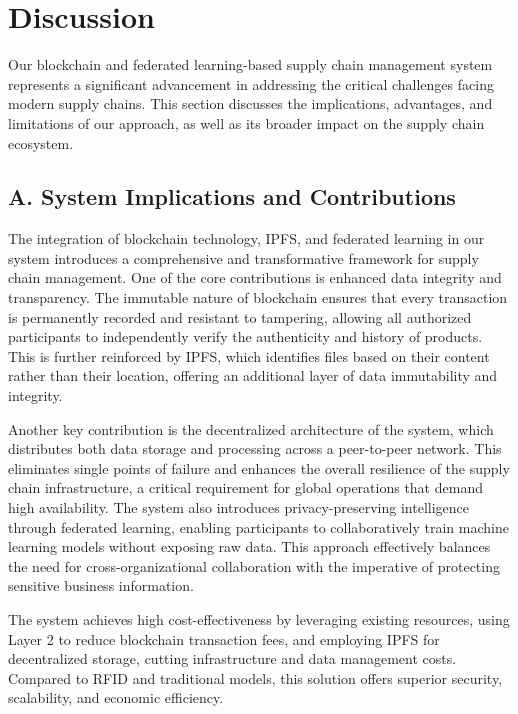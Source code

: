 \documentclass[conference]{IEEEtran}
\begin{document}
\section{Discussion}

Our blockchain and federated learning-based supply chain management system represents a significant advancement in addressing the critical challenges facing modern supply chains. This section discusses the implications, advantages, and limitations of our approach, as well as its broader impact on the supply chain ecosystem.

\subsection*{A. System Implications and Contributions}
    The integration of blockchain technology, IPFS, and federated learning in our system introduces a comprehensive and transformative framework for supply chain management. One of the core contributions is enhanced data integrity and transparency. The immutable nature of blockchain ensures that every transaction is permanently recorded and resistant to tampering, allowing all authorized participants to independently verify the authenticity and history of products. This is further reinforced by IPFS, which identifies files based on their content rather than their location, offering an additional layer of data immutability and integrity.
    
    Another key contribution is the decentralized architecture of the system, which distributes both data storage and processing across a peer-to-peer network. This eliminates single points of failure and enhances the overall resilience of the supply chain infrastructure, a critical requirement for global operations that demand high availability. The system also introduces privacy-preserving intelligence through federated learning, enabling participants to collaboratively train machine learning models without exposing raw data. This approach effectively balances the need for cross-organizational collaboration with the imperative of protecting sensitive business information.
    
    The system achieves high cost-effectiveness by leveraging existing resources, using Layer 2 to reduce blockchain transaction fees, and employing IPFS for decentralized storage, cutting infrastructure and data management costs. Compared to RFID and traditional models, this solution offers superior security, scalability, and economic efficiency.
\end{document}
